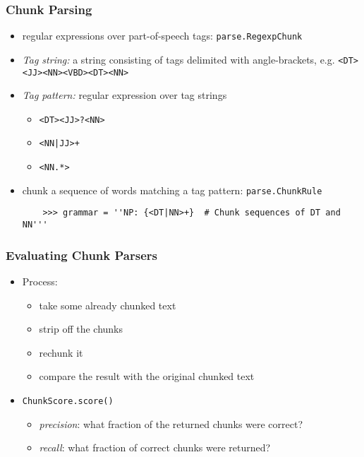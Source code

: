 \begin{frame}[fragile] \frametitle{Chunk Parsing}
  \small

  \begin{itemize}
  \item regular expressions over part-of-speech tags: \texttt{parse.RegexpChunk}
  \item \textit{Tag string:} a string consisting of tags
    delimited with angle-brackets,
    e.g. \verb/<DT><JJ><NN><VBD><DT><NN>/
  \item \textit{Tag pattern:} regular expression over tag strings
    \begin{itemize}
    \item \verb/<DT><JJ>?<NN>/
    \item \verb/<NN|JJ>+/
    \item \verb/<NN.*>/
    \end{itemize}
  \item chunk a sequence of words matching a tag pattern: \texttt{parse.ChunkRule}

\begin{lstlisting}
    >>> grammar = ''NP: {<DT|NN>+}  # Chunk sequences of DT and NN'''
\end{lstlisting}

  \end{itemize}
\end{frame}

\begin{frame}[fragile]\frametitle{Evaluating Chunk Parsers}

  \begin{itemize}
  \item Process:
    \begin{itemize}
    \item take some already chunked text
    \item strip off the chunks
    \item rechunk it
    \item compare the result with the original chunked text
    \end{itemize}
  \item \texttt{ChunkScore.score()}
    \begin{itemize}
    \item \textit{precision}: what fraction of the returned chunks were correct?
    \item \textit{recall}: what fraction of correct chunks were returned?
    \end{itemize}
  \end{itemize}
\end{frame}



